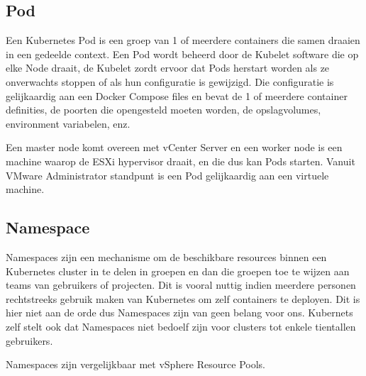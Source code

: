 \subsection{Pod}
Een Kubernetes Pod is een groep van 1 of meerdere containers die samen draaien in een gedeelde context. Een Pod wordt beheerd door de Kubelet software die op elke Node draait, de Kubelet zordt ervoor dat Pods herstart worden als ze onverwachts stoppen of als hun configuratie is gewijzigd. Die configuratie is gelijkaardig aan een Docker Compose files en bevat de 1 of meerdere container definities, de poorten die opengesteld moeten worden, de opslagvolumes, environment variabelen, enz.
\textcite{NirShtein2023}

Een master node komt overeen met vCenter Server en een worker node is een machine waarop de ESXi hypervisor draait, en die dus kan Pods starten. Vanuit VMware Administrator standpunt is een Pod gelijkaardig aan een virtuele machine.\autocite{VMware2019}



\subsection{Namespace}
Namespaces zijn een mechanisme om de beschikbare resources binnen een Kubernetes cluster in te delen in groepen en dan die groepen toe te wijzen aan teams van gebruikers of projecten. Dit is vooral nuttig indien meerdere personen rechtstreeks gebruik maken van Kubernetes om zelf containers te deployen. Dit is hier niet aan de orde dus Namespaces zijn van geen belang voor ons. Kubernets zelf stelt ook dat Namespaces niet bedoelf zijn voor clusters tot enkele tientallen gebruikers.
\textcite{Kubernetes2023c}

Namespaces zijn vergelijkbaar met vSphere Resource Pools.\autocite{VMware2019}
